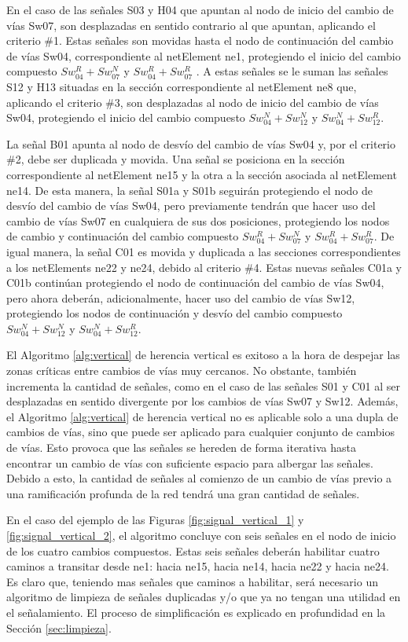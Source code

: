     En el caso de las señales S03 y H04 que apuntan al nodo de inicio del cambio de vías Sw07, son desplazadas en sentido contrario al que apuntan, aplicando el criterio \#1. Estas señales son movidas hasta el nodo de continuación del cambio de vías Sw04, correspondiente al netElement ne1, protegiendo el inicio del cambio compuesto $Sw_{04}^R+Sw_{07}^N$ y $Sw_{04}^R+Sw_{07}^R$ . A estas señales se le suman las señales S12 y H13 situadas en la sección correspondiente al netElement ne8 que, aplicando el criterio \#3, son desplazadas al nodo de inicio del cambio de vías Sw04, protegiendo el inicio del cambio compuesto $Sw_{04}^N+Sw_{12}^N$ y $Sw_{04}^N+Sw_{12}^R$.
    
    La señal B01 apunta al nodo de desvío del cambio de vías Sw04 y, por el criterio \#2, debe ser duplicada y movida. Una señal se posiciona en la sección correspondiente al netElement ne15 y la otra a la sección asociada al netElement ne14. De esta manera, la señal S01a y S01b seguirán protegiendo el nodo de desvío del cambio de vías Sw04, pero previamente tendrán que hacer uso del cambio de vías Sw07 en cualquiera de sus dos posiciones, protegiendo los nodos de cambio y continuación del cambio compuesto $Sw_{04}^R+Sw_{07}^N$ y $Sw_{04}^R+Sw_{07}^R$. De igual manera, la señal C01 es movida y duplicada a las secciones correspondientes a los netElements ne22 y ne24, debido al criterio \#4. Estas nuevas señales C01a y C01b continúan protegiendo el nodo de continuación del cambio de vías Sw04, pero ahora deberán, adicionalmente, hacer uso del cambio de vías Sw12, protegiendo los nodos de continuación y desvío del cambio compuesto $Sw_{04}^N+Sw_{12}^N$ y $Sw_{04}^N+Sw_{12}^R$.
    
    El Algoritmo \ref{alg:vertical} de herencia vertical es exitoso a la hora de despejar las zonas críticas entre cambios de vías muy cercanos. No obstante, también incrementa la cantidad de señales, como en el caso de las señales S01 y C01 al ser desplazadas en sentido divergente por los cambios de vías Sw07 y Sw12. Además, el Algoritmo \ref{alg:vertical} de herencia vertical no es aplicable solo a una dupla de cambios de vías, sino que puede ser aplicado para cualquier conjunto de cambios de vías. Esto provoca que las señales se hereden de forma iterativa hasta encontrar un cambio de vías con suficiente espacio para albergar las señales. Debido a esto, la cantidad de señales al comienzo de un cambio de vías previo a una ramificación profunda de la red tendrá una gran cantidad de señales.
    
    En el caso del ejemplo de las Figuras \ref{fig:signal_vertical_1} y \ref{fig:signal_vertical_2}, el algoritmo concluye con seis señales en el nodo de inicio de los cuatro cambios compuestos. Estas seis señales deberán habilitar cuatro caminos a transitar desde ne1: hacia ne15, hacia ne14, hacia ne22 y hacia ne24. Es claro que, teniendo mas señales que caminos a habilitar, será necesario un algoritmo de limpieza de señales duplicadas y/o que ya no tengan una utilidad en el señalamiento. El proceso de simplificación es explicado en profundidad en la Sección \ref{sec:limpieza}.